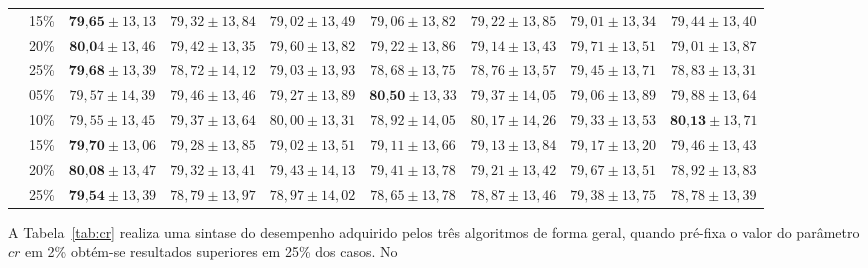 \begin{table}[h]
{\begin{tabular}{|c|c|c|c|c|c|c|c|c|}
                 & 15\% & $\textbf{79,65} \pm 13,13$ & $79,32 \pm 13,84$ & $79,02 \pm 13,49$ & $79,06 \pm 13,82$ & $79,22 \pm 13,85$ & $79,01 \pm 13,34$ & $79,44 \pm 13,40$ \\ \cline{2-9}
                 & 20\% & $\textbf{80,0}4 \pm 13,46$ & $79,42 \pm 13,35$ & $79,60 \pm 13,82$ & $79,22 \pm 13,86$ & $79,14 \pm 13,43$ & $79,71 \pm 13,51$ & $79,01 \pm 13,87$ \\ \cline{2-9}
                 & 25\% & $\textbf{79,68} \pm 13,39$ & $78,72 \pm 14,12$ & $79,03 \pm 13,93$ & $78,68 \pm 13,75$ & $78,76 \pm 13,57$ & $79,45 \pm 13,71$ & $78,83 \pm 13,31$ \\ \hline
                \parbox[t]{3mm}{}
                 & 05\% & $79,57 \pm 14,39$ & $79,46 \pm 13,46$ & $79,27 \pm 13,89$ & $\textbf{80,50} \pm 13,33$ & $79,37 \pm 14,05$ & $79,06 \pm 13,89$ & $79,88 \pm 13,64$ \\ 
                 & 10\% & $79,55 \pm 13,45$ & $79,37 \pm 13,64$ & $80,00 \pm 13,31$ & $78,92 \pm 14,05$ & $80,17 \pm 14,26$ & $79,33 \pm 13,53$ & $\textbf{80,13} \pm 13,71$ \\ 
                 & 15\% & $\textbf{79,70} \pm 13,06$ & $79,28 \pm 13,85$ & $79,02 \pm 13,51$ & $79,11 \pm 13,66$ & $79,13 \pm 13,84$ & $79,17 \pm 13,20$ & $79,46 \pm 13,43$ \\ 
                 & 20\% & $\textbf{80,08} \pm 13,47$ & $79,32 \pm 13,41$ & $79,43 \pm 14,13$ & $79,41 \pm 13,78$ & $79,21 \pm 13,42$ & $79,67 \pm 13,51$ & $78,92 \pm 13,83$ \\ 
                 & 25\% & $\textbf{79,54} \pm 13,39$ & $78,79 \pm 13,97$ & $78,97 \pm 14,02$ & $78,65 \pm 13,78$ & $78,87 \pm 13,46$ & $79,38 \pm 13,75$ & $78,78 \pm 13,39$ \\ \hline
            \end{tabular}%
        }
        \label{tab:knn-acc}
    \end{table}
    
    A Tabela~\ref{tab:cr} realiza uma sintase do desempenho adquirido pelos três algoritmos de forma geral, quando pré\hyp{fixa} o valor do parâmetro $cr$ em 2\% obtém\hyp{se} resultados superiores em 25\% dos casos. No 
    
